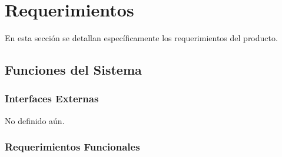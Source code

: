 \documentclass[12pt,a4paper,english,spanish]{article}
\begin{document}
\section{Requerimientos}
\label{section-req} 
En esta sección se detallan específicamente los requerimientos del producto. 

\subsection{Funciones del Sistema}

	\subsubsection{Interfaces Externas}
		 No definido aún.
		
	\subsubsection{Requerimientos Funcionales}
\end{document}
